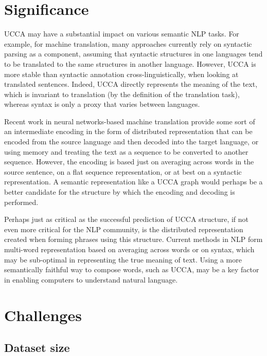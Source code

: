 \documentclass[11pt]{article}
\begin{document}
\section{Significance}

UCCA may have a substantial impact on various semantic NLP tasks. For example, for machine translation, many approaches currently rely on syntactic parsing as a component, assuming that syntactic structures in one languages tend to be translated to the same structures in another language. However, UCCA is more stable than syntactic annotation cross-linguistically, when looking at translated sentences\cite{sulem2014thesis}. Indeed, UCCA directly represents the meaning of the text, which is invariant to translation (by the definition of the translation task), whereas syntax is only a proxy that varies between languages.

Recent work in neural networks-based machine translation provide some sort of an intermediate encoding in the form of distributed representation that can be encoded from the source language and then decoded into the target language\cite{zou2013bilingual}, or using memory and treating the text as a sequence to be converted to another sequence\cite{sutskever2014sequence}. However, the encoding is based just on averaging across words in the source sentence, on a flat sequence representation, or at best on a syntactic representation. A semantic representation like a UCCA graph would perhaps be a better candidate for the structure by which the encoding and decoding is performed.

Perhaps just as critical as the successful prediction of UCCA structure, if not even more critical for the NLP community, is the distributed representation created when forming phrases using this structure. Current methods in NLP form multi-word representation based on averaging across words or on syntax, which may be sub-optimal in representing the true meaning of text. Using a more semantically faithful way to compose words, such as UCCA, may be a key factor in enabling computers to understand natural language.



\section{Challenges}

\subsection{Dataset size}
\end{document}
